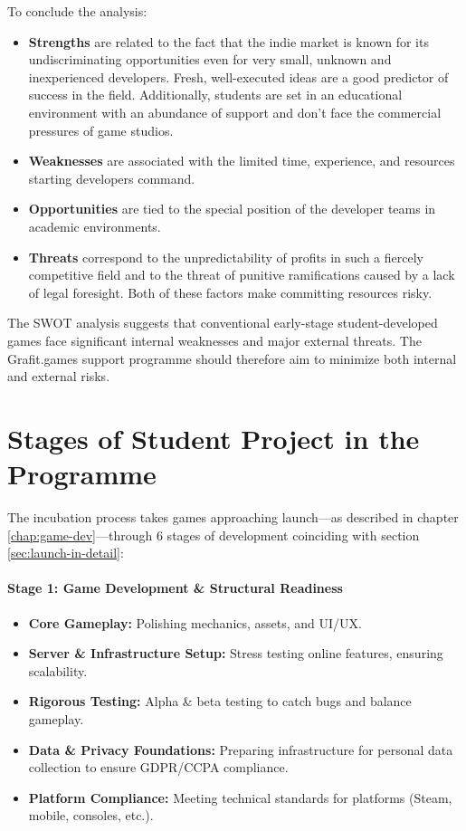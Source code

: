 To conclude the analysis:
\begin{itemize}
    \item \textbf{Strengths} are related to the fact that the indie market is known for its undiscriminating opportunities even for very small, unknown and inexperienced developers. Fresh, well-executed ideas are a good predictor of success in the field. Additionally, students are set in an educational environment with an abundance of support and don’t face the commercial pressures of game studios.
    \item \textbf{Weaknesses} are associated with the limited time, experience, and resources starting developers command. 
    \item \textbf{Opportunities} are tied to the special position of the developer teams in academic environments.
    \item \textbf{Threats} correspond to the unpredictability of profits in such a fiercely competitive field and to the threat of punitive ramifications caused by a lack of legal foresight. Both of these factors make committing resources risky.
\end{itemize}
The SWOT analysis suggests that conventional early-stage student-developed games face significant internal weaknesses and major external threats. The Grafit.games support programme should therefore aim to minimize both internal and external risks.

\section{Stages of Student Project in the Programme}\label{sec:programme-stages}
The incubation process takes games approaching launch—as described in chapter \ref{chap:game-dev}---through 6 stages of development coinciding with section \ref{sec:launch-in-detail}:
\paragraph{\large Stage 1: Game Development \& Structural Readiness}
\begin{itemize}
    \item \textbf{Core Gameplay:} Polishing mechanics, assets, and UI/UX.
    \item \textbf{Server \& Infrastructure Setup:} Stress testing online features, ensuring scalability.
    \item \textbf{Rigorous Testing:} Alpha \& beta testing to catch bugs and balance gameplay.
    \item \textbf{Data \& Privacy Foundations:} Preparing infrastructure for personal data collection to ensure GDPR/CCPA compliance.
    \item \textbf{Platform Compliance:} Meeting technical standards for platforms (Steam, mobile, consoles, etc.).
\end{itemize}
